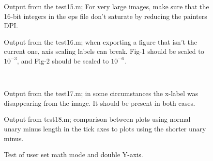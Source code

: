 \documentclass[a4paper,11pt]{article}
\begin{document}
%
\clearpage
%
     \begin{figure}[ht]
       \centering
       \caption{Output from the {\ttfamily test15.m}; For very large images, make sure that the
         16-bit integers in the eps file don't saturate by reducing the painters DPI.}
     \end{figure}
     \begin{figure}[ht]
       \centering
       \quad
       \caption{Output from the {\ttfamily test16.m}; when exporting a figure that isn't the
         current one, axis scaling labels can break. Fig-1 should be scaled to $10^{-3}$, and
         Fig-2 should be scaled to $10^{-6}$.}
     \end{figure}
     \begin{figure}[ht]
       \centering
       \\
       \caption{Output from the {\ttfamily test17.m}; in some circumstances the x-label was
         disappearing from the image. It should be present in both cases.}
     \end{figure}
%
\clearpage
%
  \begin{figure}[ht]
    \centering
    \quad
    \caption{Output from {\ttfamily test18.m}; comparison between plots using normal unary minus length in the tick axes to plots using the shorter unary minus.}
  \end{figure}
%
\clearpage
%
  \begin{figure}[ht]
    \centering
    \caption{Test of user set math mode and double Y-axis.}
  \end{figure}
\end{document}

